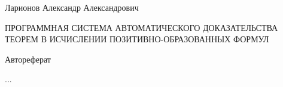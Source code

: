 \documentclass[a4paper]{report}
\begin{document}
\newpage
Ларионов Александр Александрович

ПРОГРАММНАЯ СИСТЕМА АВТОМАТИЧЕСКОГО ДОКАЗАТЕЛЬСТВА ТЕОРЕМ В ИСЧИСЛЕНИИ ПОЗИТИВНО-ОБРАЗОВАННЫХ ФОРМУЛ

Автореферат

...

%
%
%
%
%

%

%
\end{document}
